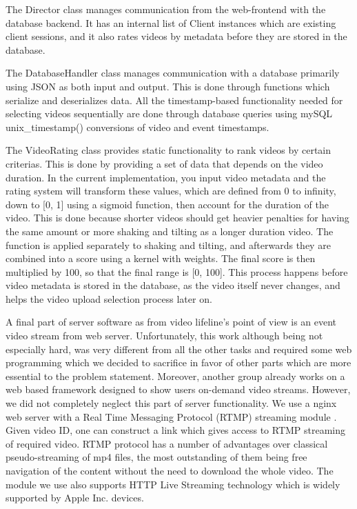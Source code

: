 \documentclass[conference]{IEEEtran}
\begin{document}
The Director class manages communication from the web-frontend with the database backend. It has an internal list
of Client instances which are existing client sessions, and it also rates videos by metadata before they are
stored in the database.

The DatabaseHandler class manages communication with a database primarily using JSON as both input and output.
This is done through functions which serialize and deserializes data. All the timestamp-based functionality needed
for selecting videos sequentially are done through database queries using mySQL unix_timestamp() conversions of
video and event timestamps.

The VideoRating class provides static functionality to rank videos by certain criterias. This is done by providing
a set of data that depends on the video duration. In the current implementation, you input video metadata and the
rating system will transform these values, which are defined from 0 to infinity, down to [0, 1] using a sigmoid function,
then account for the duration of the video. This is done because shorter videos should get heavier penalties for
having the same amount or more shaking and tilting as a longer duration video. The function is applied separately to
shaking and tilting, and afterwards they are combined into a score using a kernel with weights. The final score is
then multiplied by 100, so that the final range is [0, 100]. This process happens before video metadata is stored
in the database, as the video itself never changes, and helps the video upload selection process later on.

A final part of server software as from video lifeline's point of view is an event video stream from web server.
Unfortunately, this work although being not especially hard, was very different from all the other tasks and
required some web programming which we decided to sacrifice in favor of other parts which are more essential to the problem statement.
Moreover, another group already works on a web based framework designed to show users on-demand video streams.
However, we did not completely neglect this part of server functionality. 
We use a nginx \cite{nginx} web server with a Real Time Messaging Protocol (RTMP) streaming module \cite{nginx-rtmp-module}.
Given video ID, one can construct a link which gives access to RTMP streaming of required video.
RTMP protocol has a number of advantages over classical pseudo-streaming of mp4 files, the most outstanding of them being
free navigation of the content without the need to download the whole video.
The module we use also supports HTTP Live Streaming technology \cite{apple-hls} which is widely supported by Apple Inc. devices.
\end{document}
